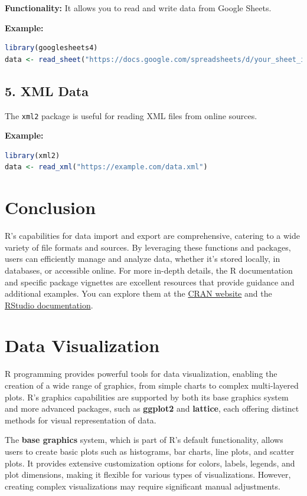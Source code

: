 \documentclass[10pt]{book}
\begin{document}
\textbf{Functionality:} It allows you to read and write data from Google Sheets.

\textbf{Example:}
\begin{lstlisting}[language=R]
library(googlesheets4)
data <- read_sheet("https://docs.google.com/spreadsheets/d/your_sheet_id")
\end{lstlisting}

\subsection{5. XML Data}
The \texttt{xml2} package is useful for reading XML files from online sources.

\textbf{Example:}
\begin{lstlisting}[language=R]
library(xml2)
data <- read_xml("https://example.com/data.xml")
\end{lstlisting}

\section{Conclusion}
R's capabilities for data import and export are comprehensive, catering to a wide variety of file formats and sources. By leveraging these functions and packages, users can efficiently manage and analyze data, whether it’s stored locally, in databases, or accessible online. For more in-depth details, the R documentation and specific package vignettes are excellent resources that provide guidance and additional examples. You can explore them at the \href{https://cran.r-project.org/}{CRAN website} and the \href{https://docs.rstudio.com/}{RStudio documentation}.








\section{Data Visualization}

R programming provides powerful tools for data visualization, enabling the creation of a wide range of graphics, from simple charts to complex multi-layered plots. R's graphics capabilities are supported by both its base graphics system and more advanced packages, such as \textbf{ggplot2} and \textbf{lattice}, each offering distinct methods for visual representation of data.

The \textbf{base graphics} system, which is part of R's default functionality, allows users to create basic plots such as histograms, bar charts, line plots, and scatter plots. It provides extensive customization options for colors, labels, legends, and plot dimensions, making it flexible for various types of visualizations. However, creating complex visualizations may require significant manual adjustments.
\end{document}

